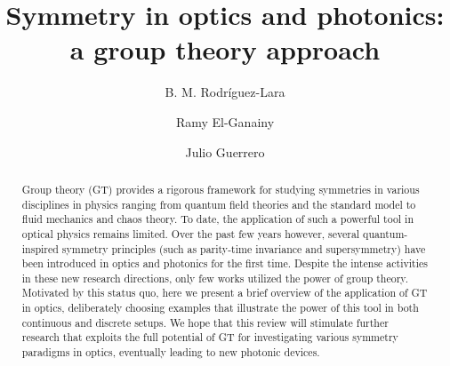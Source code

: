 \documentclass[12pt]{iopart}
\begin{document}
\title{Symmetry in optics and photonics: a group theory approach}

\author{B. M. Rodr\'iguez-Lara}
\address{Tecnologico de Monterrey, Escuela de Ingenier\'ia y Ciencias,  Monterrey 64849, M\'exico,  \\
Instituto Nacional de Astrof\'isica, \'Optica y Electr\'onica,   Puebla CP 72840, M\'exico}

\author{Ramy El-Ganainy}
\address{Department of Physics and Henes Center for Quantum Phenomena, Michigan Technological University, Houghton MI 49931, USA}

\author{Julio Guerrero}
\address{Departamento de Matem\'aticas, Facultad de Ciencias Experimentales y de la Salud, Campus Las Lagunillas, Universidad de Ja\'en, 23071 Ja\'en, Spain.\\
Departamento de Ingenier\'{\i}a y Tecnologr\'{\i}a de Computadores, Facultad de Inform\'atica, Campus Espinardo, Univesidad de Murcia, 30100 Murcia, Spain.}



\begin{abstract}
	Group theory (GT) provides a rigorous framework for studying symmetries in various disciplines in physics ranging from quantum field theories and the standard model to fluid mechanics and chaos theory. To date, the application of such a powerful tool in optical physics remains limited. Over the past few years however, several quantum-inspired symmetry principles (such as parity-time invariance and supersymmetry) have been introduced in optics and photonics for the first time. Despite the intense activities in these new research directions, only few works utilized the power of group theory. Motivated by this status quo, here we present a brief overview of the application of GT in optics, deliberately choosing examples that illustrate the power of this tool in both continuous and discrete setups. We hope that this review will stimulate further research that exploits the full potential of GT for investigating various symmetry paradigms in optics, eventually leading to new photonic devices.
\end{abstract}
\maketitle
\end{document}
